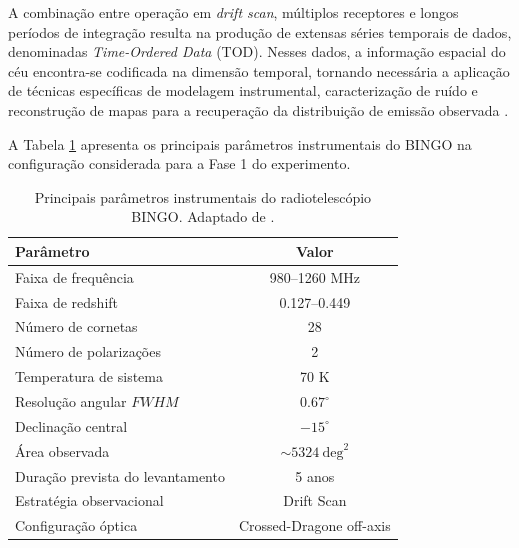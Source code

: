A combinação entre operação em \textit{drift scan}, múltiplos receptores e longos períodos de integração resulta na produção de extensas séries temporais de dados, denominadas \textit{Time-Ordered Data} (TOD). Nesses dados, a informação espacial do céu encontra-se codificada na dimensão temporal, tornando necessária a aplicação de técnicas específicas de modelagem instrumental, caracterização de ruído e reconstrução de mapas para a recuperação da distribuição de emissão observada \cite{wuensche2022bingoII}.

A Tabela \ref{tab:parametros_bingo} apresenta os principais parâmetros instrumentais do BINGO na configuração considerada para a Fase 1 do experimento.

\begin{table}[htbp]
\centering
\caption{Principais parâmetros instrumentais do radiotelescópio BINGO. Adaptado de \cite{abdalla2022bingoI,wuensche2022bingoII}.}
\label{tab:parametros_bingo}
\begin{tabular}{lc}
\hline
Parâmetro & Valor \\
\hline
Faixa de frequência & 980--1260 MHz \\
Faixa de redshift & 0.127--0.449 \\
Número de cornetas & 28 \\
Número de polarizações & 2 \\
Temperatura de sistema & 70 K \\
Resolução angular \(FWHM\) & \(0.67^\circ\) \\
Declinação central & \(-15^\circ\) \\
Área observada & \(\sim 5324\ \mathrm{deg}^2\) \\
Duração prevista do levantamento & 5 anos \\
Estratégia observacional & Drift Scan \\
Configuração óptica & Crossed-Dragone off-axis \\
\hline
\end{tabular}
\end{table}



